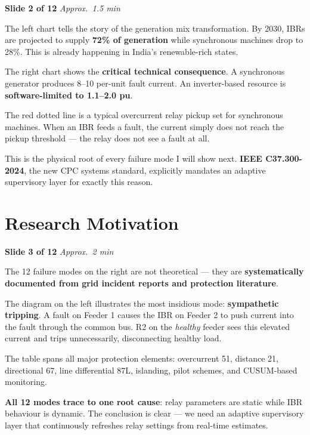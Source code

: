 \documentclass[12pt, a4paper]{article}
\newenvironment{notebox}{%
  \begin{tcolorbox}[
    colback=noteBg,
    colframe=iitmMaroon!40,
    boxrule=0.6pt,
    arc=3pt,
    left=8pt, right=8pt, top=6pt, bottom=6pt
  ]
  \setstretch{1.4}\small
}{%
  \end{tcolorbox}
}
\newcommand{\slidetag}[2]{%
  \noindent
  \textcolor{slideNum}{\footnotesize\bfseries Slide #1} \hfill
  \textcolor{iitmGold!80!black}{\footnotesize\itshape Approx.\ #2}\\[2pt]
}
\begin{document}
\slidetag{2 of 12}{1.5 min}
\begin{notebox}
The left chart tells the story of the generation mix transformation.
By 2030, IBRs are projected to supply \textbf{72\% of generation} while synchronous
machines drop to 28\%. This is already happening in India's renewable-rich states.

The right chart shows the \textbf{critical technical consequence}.
A synchronous generator produces 8--10 per-unit fault current.
An inverter-based resource is \textbf{software-limited to 1.1--2.0 pu}.

The red dotted line is a typical overcurrent relay pickup set for synchronous machines.
When an IBR feeds a fault, the current simply does not reach the pickup threshold ---
the relay does not see a fault at all.

This is the physical root of every failure mode I will show next.
\textbf{IEEE C37.300-2024}, the new CPC systems standard, explicitly mandates an
adaptive supervisory layer for exactly this reason.
\end{notebox}

\section{Research Motivation}

\slidetag{3 of 12}{2 min}
\begin{notebox}
The 12 failure modes on the right are not theoretical --- they are \textbf{systematically
documented from grid incident reports and protection literature}.

The diagram on the left illustrates the most insidious mode: \textbf{sympathetic tripping}.
A fault on Feeder 1 causes the IBR on Feeder 2 to push current into the fault through
the common bus. R2 on the \emph{healthy} feeder sees this elevated current and trips
unnecessarily, disconnecting healthy load.

The table spans all major protection elements: overcurrent 51, distance 21, directional
67, line differential 87L, islanding, pilot schemes, and CUSUM-based monitoring.

\textbf{All 12 modes trace to one root cause}: relay parameters are static while IBR
behaviour is dynamic. The conclusion is clear --- we need an adaptive supervisory layer
that continuously refreshes relay settings from real-time estimates.
\end{notebox}
\end{document}
